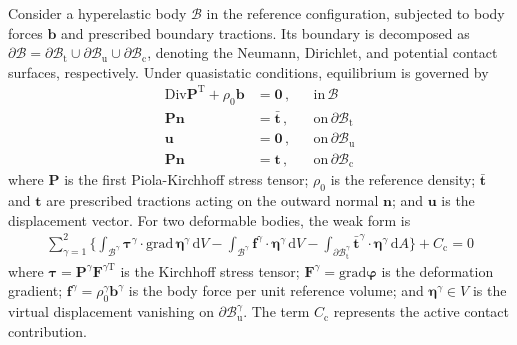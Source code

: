 \documentclass[review, authoryear, 12pt]{elsarticle}
\begin{document}
Consider a hyperelastic body $\bm{\mathcal{B}}$ in the reference configuration, subjected to body forces $\mathbf{b}$ and prescribed boundary tractions. Its boundary is decomposed as $\partial \bm{\mathcal{B}} = \partial \bm{\mathcal{B}}_{\text{t}} \cup \partial \bm{\mathcal{B}}_{\text{u}} \cup \partial \bm{\mathcal{B}}_{\text{c}}$, denoting the Neumann, Dirichlet, and potential contact surfaces, respectively. Under quasistatic conditions, equilibrium is governed by
\begin{align}
    \text{Div} \mathbf{P}^\text{T} + \rho_0 \mathbf{b} &= \mathbf{0} \,, &&\text{in} \, \bm{\mathcal{B}} \\ %
    \mathbf{P} \mathbf{n} &= \bar{\mathbf{t}} \,, &&\text{on} \, \partial \bm{\mathcal{B}}_{\text{t}} \\ %
    \mathbf{u} &= \mathbf{0} \,, &&\text{on} \, \partial \bm{\mathcal{B}}_{\text{u}} \\ %
    \mathbf{P} \mathbf{n} &= \mathbf{t} \,, &&\text{on} \, \partial \bm{\mathcal{B}}_{\text{c}} %
\end{align}
where $\mathbf{P}$ is the first Piola-Kirchhoff stress tensor; $\rho_0$ is the reference density; $\bar{\mathbf{t}}$ and $\mathbf{t}$ are prescribed tractions acting on the outward normal $\mathbf{n}$; and $\mathbf{u}$ is the displacement vector. For two deformable bodies, the weak form is
\begin{align}
    \sum_{\gamma=1}^2 \Bigg\{ 
        \int_{\bm{\mathcal{B}}^{\gamma}} \bm{\tau}^{\gamma} \cdot \text{grad} \, \bm{\eta}^{\gamma} \, \text{d}V 
        - \int_{\bm{\mathcal{B}}^{\gamma}} \mathbf{f}^{\gamma} \cdot \bm{\eta}^{\gamma} \, \text{d}V 
        - \int_{\partial \bm{\mathcal{B}}_{\text{t}}^{\gamma}} \bar{\mathbf{t}}^{\gamma} \cdot \bm{\eta}^{\gamma} \, \text{d}A 
        \Bigg\} 
    + C_{\text{c}} = 0 %
\end{align}
where $\bm{\tau} = \mathbf{P}^{\gamma} \mathbf{F}^{\gamma \text{T}}$ is the Kirchhoff stress tensor; $\mathbf{F}^{\gamma} = \text{grad} \bm{\varphi}$ is the deformation gradient; $\mathbf{f}^{\gamma} = \rho_0^{\gamma} \mathbf{b}^{\gamma}$ is the body force per unit reference volume; and $\bm{\eta}^{\gamma} \in V$ is the virtual displacement vanishing on $\partial \bm{\mathcal{B}}_{\text{u}}^{\gamma}$. The term $C_{\text{c}}$ represents the active contact contribution.
\end{document}
